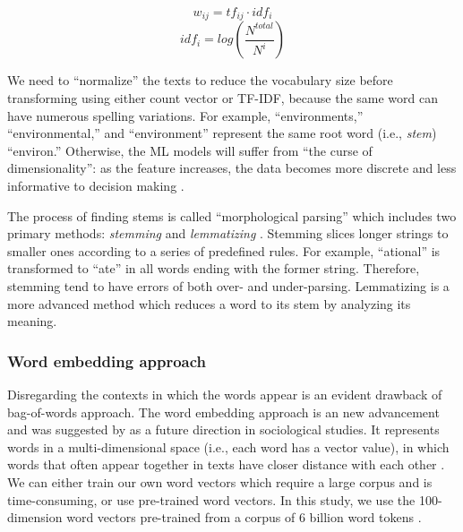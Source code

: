 \documentclass[11pt]{article}
\begin{document}
\begin{equation} \label{eq:tfidf}
 w_{ij} = tf_{ij} \cdot idf_i 
\end{equation}
\begin{equation} \label{eq:idf}
idf_i = log(\frac{N^{total}}{N^{i}})
\end{equation}

We need to ``normalize'' the texts to reduce the vocabulary size before transforming using either count vector or TF-IDF, because the same word can have numerous spelling variations. For example, ``environments,'' ``environmental,'' and ``environment'' represent the same root word (i.e., \textit{stem}) ``environ.'' Otherwise, the ML models will suffer from ``the curse of dimensionality'': as the feature increases, the data becomes more discrete and less informative to decision making \parencite[94]{BellmanAdaptiveControlProcesses2015}. 

The process of finding stems is called ``morphological parsing'' which includes two primary methods: \textit{stemming} and \textit{lemmatizing} \parencite[25]{JurafskySpeechLanguageProcessing2017}. Stemming slices longer strings to smaller ones according to a series of predefined rules. For example, ``ational'' is transformed to ``ate'' in all words ending with the former string. Therefore, stemming tend to have errors of both over- and under-parsing. Lemmatizing is a more advanced method which reduces a word to its stem by analyzing its meaning.

\subsubsection{Word embedding approach}

Disregarding the contexts in which the words appear is an evident drawback of bag-of-words approach. The word embedding approach is an new advancement \parencite{MikolovEfficientEstimationWord2013} and was suggested by \textcite{NelsonFutureCodingComparison2018} as a future direction in sociological studies. It represents words in a multi-dimensional space (i.e., each word has a vector value), in which words that often appear together in texts have closer distance with each other \parencites[][290]{JurafskySpeechLanguageProcessing2017}[][65]{BengfortAppliedTextAnalysis2018}. We can either train our own word vectors which require a large corpus and is time-consuming, or use pre-trained word vectors. In this study, we use the 100-dimension word vectors pre-trained from a corpus of 6 billion word tokens \parencite{PenningtonGloveGlobalVectors2014}.
\end{document}
